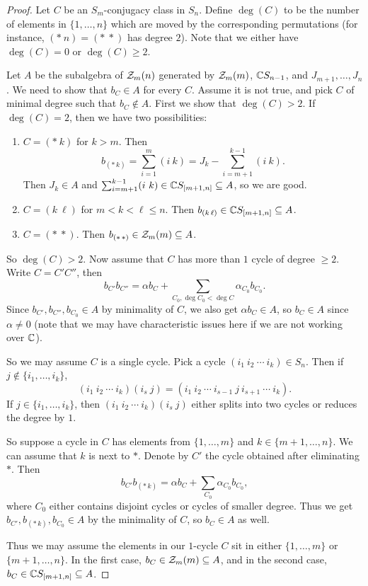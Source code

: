 \begin{proof}
  Let $C$ be an $S_m$-conjugacy class in
  $S_n$.
  Define $\deg(C)$ to be the number of
  elements in $\{1, \dots, n\}$ which
  are moved by the corresponding
  permutations (for instance,
  $({*}\ n) = ({*}\ {*})$ has degree $2$).
  Note that we either have
  $\deg(C) = 0$ or $\deg(C) \ge 2$.

  Let $A$ be the subalgebra of
  $\mathcal{Z}_m(n)$ generated by
  $\mathcal{Z}_m(m)$, $\mathbb{C} S_{n-1}$, and
  $J_{m + 1}, \dots, J_n$. We need
  to show that $b_C \in A$ for every $C$.
  Assume it is not true, and pick
  $C$ of minimal degree such that
  $b_C \notin A$. First we show that
  $\deg(C) > 2$. If $\deg(C) = 2$, then
  we have two possibilities:
  \begin{enumerate}
    \item $C = ({*}\ k)$ for $k > m$.
      Then
      \[
        b_{({*}\, k)}
        = \sum_{i = 1}^m (i\ k)
        = J_k - \sum_{i = m + 1}^{k - 1} (i\ k).
      \]
      Then $J_k \in A$ and
      $\sum_{i = m + 1}^{k - 1} (i\ k) \in \mathbb{C} S_{[m + 1, n]} \subseteq A$, so
      we are good.
    \item $C = (k\ \ell)$ for
      $m < k < \ell \le n$. Then
      $b_{(k\, \ell)} \in \mathbb{C} S_{[m + 1, n]} \subseteq A$.
    \item $C = ({*}\ {*})$. Then
      $b_{({*}\, {*})} \in \mathcal{Z}_m(m) \subseteq A$.
  \end{enumerate}
  So $\deg(C) > 2$.
  Now assume that $C$ has more than
  $1$ cycle of degree $\ge 2$. Write
  $C = C' C''$, then
  \[
    b_{C'} b_{C''}
    = \alpha b_C + \sum_{C_0, \deg C_0 < \deg C} \alpha_{C_0} b_{C_0}.
  \]
  Since $b_{C'}, b_{C''}, b_{C_0} \in A$
  by minimality of $C$, we also get
  $\alpha b_C \in A$, so
  $b_C \in A$ since $\alpha \ne 0$ (note
  that we may have characteristic
  issues here if we are not working over $\mathbb{C}$).

  So  we may assume $C$ is a
  single cycle. Pick a cycle
  $(i_1\ i_2\ \cdots\ i_k) \in S_n$.
  Then if $j \notin \{i_1, \dots, i_k\}$,
  \[
    (i_1\ i_2\ \cdots\ i_k)
    (i_s\ j)
    = (i_1\ i_2\ \cdots\ i_{s - 1}\ j\ i_{s + 1}\ \cdots\ i_k).
  \]
  If $j \in \{i_1, \dots, i_k\}$,
  then $(i_1\ i_2\ \cdots\ i_k)(i_s\ j)$ either
  splits into two cycles or
  reduces the degree by $1$.

  So suppose a cycle in $C$ has
  elements from $\{1, \dots, m\}$
  and $k \in \{m + 1, \dots, n\}$.
  We can assume that $k$ is next to $*$.
  Denote by $C'$ the cycle obtained
  after eliminating $*$. Then
  \[
    b_{C'} b_{({*}\, k)}
    = \alpha b_C + \sum_{C_0} \alpha_{C_0} b_{C_0},
  \]
  where $C_0$ either contains disjoint
  cycles or cycles
  of smaller degree. Thus we get
  $b_{C'}, b_{({*}\, k)}, b_{C_0} \in A$
  by the minimality of $C$, so
  $b_C \in A$ as well.

  Thus we may assume the elements in our
  $1$-cycle $C$ sit in either
  $\{1, \dots, m\}$ or $\{m + 1, \dots, n\}$.
  In the first case, $b_C \in \mathcal{Z}_m(m) \subseteq A$, and
  in the second case,
  $b_C \in \mathbb{C} S_{[m + 1, n]} \subseteq A$.
\end{proof}

